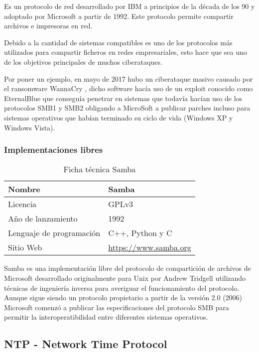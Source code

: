 Es un protocolo de red desarrollado por IBM a principios de la década de los 90 y adoptado por Microsoft a partir de 1992. Este protocolo permite compartir archivos e impresoras en red.

\bigskip
Debido a la cantidad de sistemas compatibles es uno de los protocolos más utilizados para compartir ficheros en redes empresariales, esto hace que sea uno de los objetivos principales de muchos ciberataques.

\bigskip
Por poner un ejemplo, en mayo de 2017 hubo un ciberataque masivo causado por el ransomware WannaCry \cite{sarabia_mayor_2017}, dicho software hacía uso de un exploit conocido como EternalBlue que conseguía penetrar en sistemas que todavía hacían uso de los protocolos SMB1 y SMB2 obligando a MicroSoft a publicar parches incluso para sistemas operativos que habían terminado su ciclo de vida (Windows XP y Windows Vista).


\subsubsection {Implementaciones libres}

\begin{table}[H]
\begin{tabular}{|l|l|}
\hline
Nombre                   & Samba                        \\ \hline
Licencia                 & GPLv3                        \\ \hline
Año de lanzamiento       & 1992                         \\ \hline
Lenguaje de programación & C++, Python y C              \\ \hline
Sitio Web                & \url{https://www.samba.org} 	\\ \hline
\end{tabular}
\caption{Ficha técnica Samba}
\end{table}

Samba es una implementación libre del protocolo de compartición de archivos de Microsoft desarrollado originalmente para Unix por Andrew Tridgell utilizando técnicas de ingeniería inversa para averiguar el funcionamiento del protocolo. Aunque sigue siendo un protocolo propietario a partir de la versión 2.0 (2006) Microsoft comenzó a publicar las especificaciones del protocolo SMB para permitir la interoperatibilidad entre diferentes sistemas operativos.


\subsection {NTP - Network Time Protocol}

